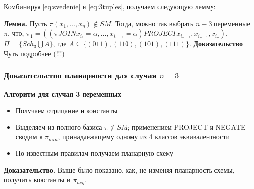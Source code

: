 \documentclass[12pt]{article}
\begin{document}

Комбинируя \ref{eq:svedenie} и \ref{eq:3tuples}, получаем следующую лемму:

\label{eq:main_lemma}
\textbf{Лемма.} Пусть $\pi(x_1, \dots, x_n) \notin SM$. Тогда, можно так выбрать $n-3$ переменные $\pi$, что,
$\pi_1 = ((\pi JOIN x_{i_1}=\bar{\alpha}, \dots, x_{i_{n-3}}=\bar{\alpha}) PROJECT x_{i_{n-2}}, x_{i_{n-1}}, x_{i_n})$,
$\Pi = \{ Sch_3 \bigcup A \}$, где $A \subseteq \{ (011), (110), (101), (111) \} $.
\textbf{Доказательство} Чуть подробнее (!!!)

\subsubsection{Доказательство планарности для случая $n = 3$}

\textbf{Алгоритм для случая 3 переменных}
\begin{itemize}
\item{Получаем отрицание и константы}
\item{Выделяем из полного базиса $\pi \notin SM$; применением PROJECT и NEGATE сводим к $\pi_{min}$,
 принадлежащему одному из 4 классов эквивалентности}
\item{По известным правилам получаем планарную схему}
\end{itemize}

\textbf{Доказательство.}
Выше было показано, как, не изменяя планарность схемы, получить константы и $\pi_{neg}$. 
\end{document}
